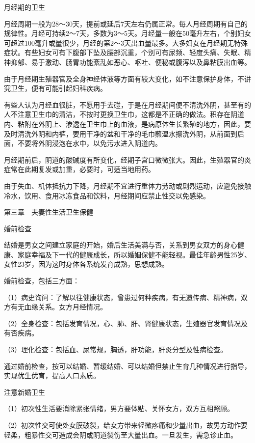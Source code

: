 \documentclass[12pt,UTF8]{ctexbook}
\begin{document}
月经期的卫生

月经周期一般为28～30天，提前或延后7天左右仍属正常。每人月经周期有自己的规律性。月经可持续2～7天，多数为3～5天。月经量一般在50毫升左右，个别妇女可超过100毫升或量很少，月经的第2～3天出血量最多。大多妇女在月经期无特殊症状。有些妇女可有下腹部下坠及腰部沉重，个别可有尿频、轻度头痛、失眠、精神抑郁、易于激动、肠胃功能紊乱如恶心、呕吐、便秘或腹泻以及鼻粘膜出血等。

由于月经期生殖器官及全身神经体液等方面有较大变化，如不注意保护身体，不讲究卫生，便有可能引起妇科疾病。

有些人认为月经血很脏，不愿用手去碰，于是在月经期间便不清洗外阴，甚至有的人不注意卫生巾的清洁，不按时更换卫生巾，这都是不正确的做法。积存在阴道内、粘附在外阴上、渗透在卫生巾上的血液，是病原体生长繁殖的地方，因此，要及时清洗外阴和内裤，要用干净的盆和干净的毛巾蘸温水擦洗外阴，从前面到后面，不要将外阴浸泡在水中，以免污水进入阴道内。

月经期前后，阴道的酸碱度有所变化，经期子宫口微微张大。因此，生殖器官的炎症常在此期复发或加重，必要时，可适当地用药。

由于失血、机体抵抗力下降，月经期不宜进行重体力劳动或剧烈运动，应避免接触冷水，饮用、食用冰冻食品和饮料，月经期间应禁止性交以免感染。





第三章　夫妻性生活卫生保健


婚前检查


结婚是男女之间建立家庭的开始，婚后生活美满与否，关系到男女双方的身心健康、家庭幸福及下一代的健康成长，所以婚姻保健不能轻视。最佳年龄男性25岁、女性23岁，因为这时身体各系统发育成熟，思想成熟。

婚前检查，包括三方面：

（1）病史询问：了解以往健康状态，曾患过何种疾病，有无遗传病、精神病，双方有无血缘关系。女方月经情况。

（2）全身检查：包括发育情况，心、肺、肝、肾健康状态，生殖器官发育情况及有否疾病。

（3）理化检查：包括血、尿常规，胸透，肝功能，肝炎分型及性病检查。

通过婚前检查，按可以结婚、暂缓结婚、可以结婚但禁止生育几种情况进行指导，实现优生优育，提高人口素质。





注意新婚卫生


（1）初次性生活要消除紧张情绪，男方要体贴、关怀女方，双方互相照顾。

（2）初次性交可使处女膜破裂，给女方带来轻微疼痛和少量出血，故男方动作要轻柔，粗暴性交可造成会阴或阴道裂伤至大量出血。一旦发生，需急诊止血。
\end{document}
